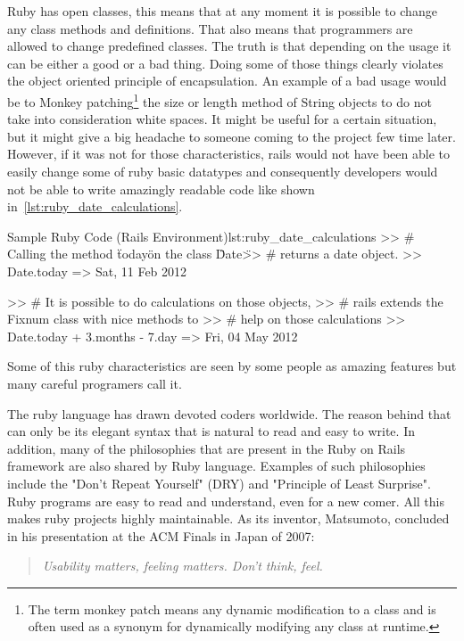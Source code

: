 Ruby has open classes, this means that at any moment it is possible to change 
any class methods and definitions. That also means that programmers are allowed to change predefined classes.
The truth is that depending on the usage it can be either a good or a bad thing.
Doing some of those things clearly violates the object oriented principle of encapsulation. 
An example of a bad usage would be to 
\textsf{Monkey patching}\footnote{
  The term monkey patch means any dynamic modification to a class and 
  is often used as a synonym for dynamically modifying any class at runtime.
} 
the size or length method of String objects to do not take into consideration white spaces.
It might be useful for a certain situation, 
but it might give a big headache to someone coming to the project few time later.
However, if it was not for those characteristics, 
rails would not have been able to easily change some of ruby basic datatypes and 
consequently developers would not be able to write amazingly readable code like shown in~\ref{lst:ruby_date_calculations}.

\begin{rubycode}{Sample Ruby Code (Rails Environment)}{lst:ruby_date_calculations}
  >> # Calling the method \"today\" on the class \"Date\" 
  >> # returns a date object.
  >> Date.today 
  => Sat, 11 Feb 2012

  >> # It is possible to do calculations on those objects, 
  >> # rails extends the Fixnum class with nice methods to 
  >> # help on those calculations
  >> Date.today + 3.months - 7.day
  => Fri, 04 May 2012
\end{rubycode}

Some of this ruby characteristics are seen by some people as amazing features 
but many careful programers call it.

The ruby language has drawn devoted coders worldwide.
The reason behind that can only be its elegant syntax that is natural to read and easy to write. 
In addition, many of the philosophies that are present in the Ruby on Rails framework are also shared by Ruby language.
Examples of such philosophies include the "Don't Repeat Yourself" (DRY) and "Principle of Least Surprise".
Ruby programs are easy to read and understand, even for a new comer. 
All this makes ruby projects highly maintainable.
As its inventor, Matsumoto, concluded in his presentation at the ACM Finals in Japan of 2007: 
\begin{quote}\emph{
  Usability matters, feeling matters. Don't think, feel.
}\end{quote}




